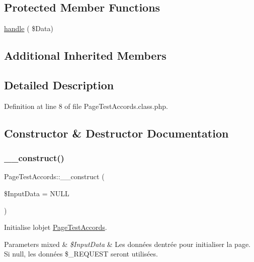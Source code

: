\subsection*{Protected Member Functions}
\begin{DoxyCompactItemize}
\item 
\hyperlink{class_page_test_accords_a13df380846bd8e51f5f1bb405894d543}{handle} ( \$Data)
\end{DoxyCompactItemize}
\subsection*{Additional Inherited Members}


\subsection{Detailed Description}


Definition at line 8 of file Page\+Test\+Accords.\+class.\+php.



\subsection{Constructor \& Destructor Documentation}
\mbox{\label{class_page_test_accords_ad6555048fa59957079e5b3df9a6628e9}} 
\subsubsection{\texorpdfstring{\+\_\+\+\_\+construct()}{\_\_construct()}}
{\footnotesize\ttfamily Page\+Test\+Accords\+::\+\_\+\+\_\+construct (\begin{DoxyParamCaption}\item[{}]{\$\+Input\+Data = {\ttfamily NULL} }\end{DoxyParamCaption})}

Initialise l\textquotesingle{}objet \hyperlink{class_page_test_accords}{Page\+Test\+Accords}.


\begin{DoxyParams}[1]{Parameters}
mixed & {\em \$\+Input\+Data} & Les données d\textquotesingle{}entrée pour initialiser la page. Si null, les données \$\+\_\+\+R\+E\+Q\+U\+E\+ST seront utilisées. \\
\hline
\end{DoxyParams}


